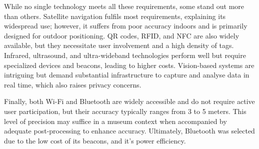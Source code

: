While no single technology meets all these requirements, some stand out more than others. Satellite navigation fulfils most requirements, explaining its widespread use; however, it suffers from poor accuracy indoors and is primarily designed for outdoor positioning. QR codes, RFID, and NFC are also widely available, but they necessitate user involvement and a high density of tags. Infrared, ultrasound, and ultra-wideband technologies perform well but require specialized devices and beacons, leading to higher costs. Vision-based systems are intriguing but demand substantial infrastructure to capture and analyse data in real time, which also raises privacy concerns.  

Finally, both Wi-Fi and Bluetooth are widely accessible and do not require active user participation, but their accuracy typically ranges from 3 to 5 meters. This level of precision may suffice in a museum context when accompanied by adequate post-processing to enhance accuracy. Ultimately, Bluetooth was selected due to the low cost of its beacons, and it's power efficiency.

